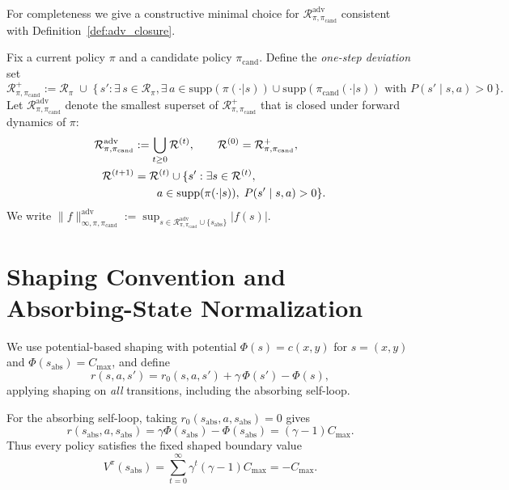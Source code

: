\documentclass{article}
\theoremstyle{plain}
\theoremstyle{definition}
\theoremstyle{remark}
\begin{document}
For completeness we give a constructive minimal choice for $\mathcal{R}_{\pi,\pi_{\mathrm{cand}}}^{\mathrm{adv}}$ consistent with Definition~\ref{def:adv_closure}.

Fix a current policy $\pi$ and a candidate policy $\pi_{\mathrm{cand}}$.
Define the \emph{one-step deviation} set
\begin{equation}
\mathcal{R}_{\pi,\pi_{\mathrm{cand}}}^{+}
:=
\mathcal{R}_\pi
\;\cup\;
\bigl\{\,s' : \exists\, s\in\mathcal{R}_\pi,
\exists\, a\in \mathrm{supp}(\pi(\cdot|s))\cup\mathrm{supp}(\pi_{\mathrm{cand}}(\cdot|s))
\text{ with } P(s'\mid s,a)>0\,\bigr\}.
\label{eq:R_plus_def_app}
\end{equation}
Let $\mathcal{R}_{\pi,\pi_{\mathrm{cand}}}^{\mathrm{adv}}$ denote the smallest superset of $\mathcal{R}_{\pi,\pi_{\mathrm{cand}}}^{+}$ that is closed under forward dynamics of $\pi$:
\begin{align}
\mathcal{R}_{\pi,\pi_{\mathrm{cand}}}^{\mathrm{adv}}
&:=
\bigcup_{t\ge 0} \mathcal{R}^{(t)},
\qquad
\mathcal{R}^{(0)}=\mathcal{R}_{\pi,\pi_{\mathrm{cand}}}^{+},
\notag\\
\mathcal{R}^{(t+1)}&=\mathcal{R}^{(t)}\cup\{s' : \exists s\in \mathcal{R}^{(t)},\notag\\
&\qquad a\in \mathrm{supp}(\pi(\cdot|s)),\; P(s'\mid s,a)>0\}.
\label{eq:R_adv_def_app}
\end{align}
We write $\|f\|_{\infty,\pi,\pi_{\mathrm{cand}}}^{\mathrm{adv}}
:= \sup_{s\in \mathcal{R}_{\pi,\pi_{\mathrm{cand}}}^{\mathrm{adv}}\cup\{s_{\mathrm{abs}}\}} |f(s)|$.

\section{Shaping Convention and Absorbing-State Normalization}
\label{app:shaping_convention}

We use potential-based shaping with potential $\Phi(s)=c(x,y)$ for $s=(x,y)$ and $\Phi(s_{\mathrm{abs}})=C_{\max}$, and define
\begin{equation}
r(s,a,s')
=
r_0(s,a,s')
+
\gamma\,\Phi(s')-\Phi(s),
\end{equation}
applying shaping on \emph{all} transitions, including the absorbing self-loop.

For the absorbing self-loop, taking $r_0(s_{\mathrm{abs}},a,s_{\mathrm{abs}})=0$ gives
\[
r(s_{\mathrm{abs}},a,s_{\mathrm{abs}})
=
\gamma \Phi(s_{\mathrm{abs}})-\Phi(s_{\mathrm{abs}})
=
(\gamma-1)C_{\max}.
\]
Thus every policy satisfies the fixed shaped boundary value
\[
V^\pi(s_{\mathrm{abs}})
=
\sum_{t=0}^\infty \gamma^t (\gamma-1)C_{\max}
=
-C_{\max}.
\]
\end{document}
